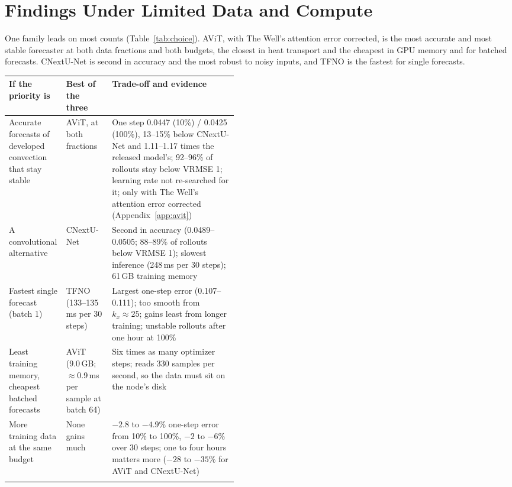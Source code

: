 \documentclass[11pt]{article}
\begin{document}
\section{Findings Under Limited Data and Compute}
\label{sec:findings}

One family leads on most counts (Table~\ref{tab:choice}). AViT, with The Well's attention error corrected, is the
most accurate and most stable forecaster at both data fractions and both budgets, the closest in heat transport and
the cheapest in GPU memory and for batched forecasts. CNextU-Net is second in accuracy and the most robust to noisy
inputs, and TFNO is the fastest for single forecasts.

\begin{table}[tp]
\centering\footnotesize
\begin{tabularx}{\linewidth}{@{}>{\raggedright\arraybackslash}p{0.25\linewidth}>{\raggedright\arraybackslash}p{0.2\linewidth}>{\raggedright\arraybackslash}X@{}}
\toprule
If the priority is & Best of the three & Trade-off and evidence \\
\midrule
Accurate forecasts of developed convection that stay stable & AViT, at both fractions & One step 0.0447 (10\%) /
0.0425 (100\%), 13--15\% below CNextU-Net and 1.11--1.17 times the released model's; 92--96\% of rollouts stay below
VRMSE 1; learning rate not re-searched for it; only with The Well's attention error corrected
(Appendix~\ref{app:avit}) \\ \addlinespace[3pt]
A convolutional alternative & CNextU-Net & Second in accuracy (0.0489--0.0505; 88--89\% of rollouts below VRMSE 1);
slowest inference (248\,ms per 30 steps); 61\,GB training memory \\ \addlinespace[3pt]
Fastest single forecast (batch 1) & TFNO (133--135\,ms per 30 steps) & Largest one-step error (0.107--0.111); too
smooth from $k_x\approx25$; gains least from longer training; unstable rollouts after one hour at 100\% \\
\addlinespace[3pt]
Least training memory, cheapest batched forecasts & AViT (9.0\,GB; $\approx$0.9\,ms per sample at batch 64) & Six
times as many optimizer steps; reads 330 samples per second, so the data must sit on the node's disk \\
\addlinespace[3pt]
More training data at the same budget & None gains much & $-2.8$ to $-4.9$\% one-step error from 10\% to 100\%, $-2$
to $-6$\% over 30 steps; one to four hours matters more ($-28$ to $-35$\% for AViT and CNextU-Net) \\
\addlinespace[3pt]

\end{tabularx}
\end{table}
\end{document}
